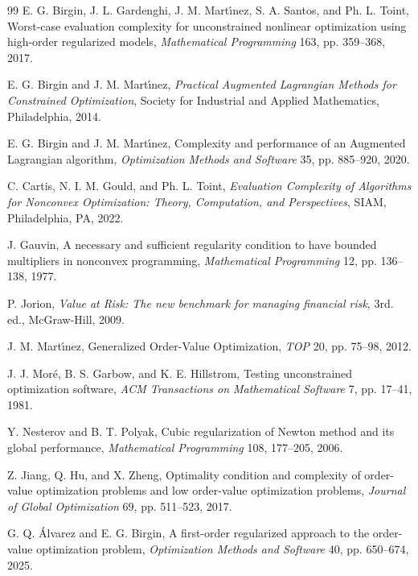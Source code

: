 \documentclass[11pt]{article}
\newcounter{alg}[section]
\begin{document}
\begin{thebibliography}{99}
 E. G. Birgin, J. L. Gardenghi, J. M. Mart\'{\i}nez, S. A. Santos, and Ph. L. Toint, Worst-case evaluation complexity for unconstrained nonlinear optimization using high-order regularized models, \textit{Mathematical Programming} 163, pp. 359--368, 2017.

 E. G. Birgin and J. M. Mart\'{\i}nez, \textit{Practical Augmented Lagrangian Methods for Constrained Optimization}, Society for Industrial and Applied Mathematics, Philadelphia, 2014.

 E. G. Birgin and J. M. Mart\'{\i}nez, Complexity and performance of an Augmented Lagrangian algorithm, \textit{Optimization Methods and Software} 35, pp. 885--920, 2020.

 C. Cartis, N. I. M. Gould, and Ph. L. Toint, \textit{Evaluation Complexity of Algorithms for Nonconvex Optimization: Theory, Computation, and Perspectives}, SIAM, Philadelphia, PA, 2022.

 J. Gauvin, A necessary and sufficient regularity condition to have bounded multipliers in nonconvex programming, \textit{Mathematical Programming} 12, pp. 136--138, 1977.

 P. Jorion, \textit{Value at {R}isk: {T}he new benchmark for managing financial risk}, 3rd. ed., McGraw-Hill, 2009.

 J. M. Mart\'{\i}nez, Generalized Order-Value Optimization, \textit{TOP} 20, pp. 75--98, 2012.

 J. J. Mor\'e, B. S. Garbow, and K. E. Hillstrom, Testing unconstrained optimization software, \textit{ACM Transactions on Mathematical Software} 7, pp. 17--41, 1981.

 Y. Nesterov and B. T. Polyak, Cubic regularization of Newton method and its global performance, \textit{Mathematical Programming} 108, 177--205, 2006.

 Z. Jiang, Q. Hu, and X. Zheng, Optimality condition and complexity of order-value optimization problems and low order-value optimization problems, \textit{Journal of Global Optimization} 69, pp. 511--523, 2017.

 G. Q. Álvarez and E. G. Birgin, A first-order regularized approach to the order-value optimization problem, \textit{Optimization Methods and Software} 40, pp. 650--674, 2025.
    
\end{thebibliography}
\end{document}
